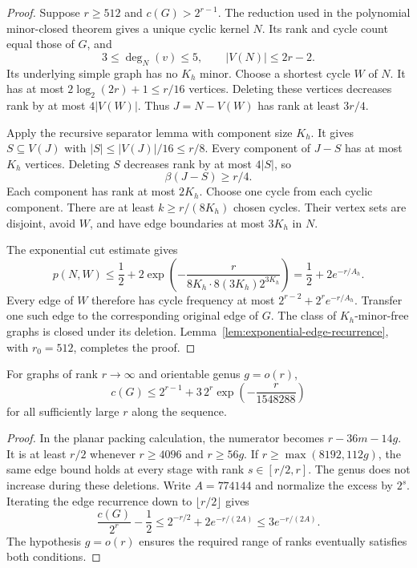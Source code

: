 \begin{proof}
Suppose $r\ge512$ and $c(G)>2^{r-1}$.
The reduction used in the polynomial minor-closed theorem gives a unique cyclic kernel $N$.
Its rank and cycle count equal those of $G$, and
\[
 3\le\deg_N(v)\le5,\qquad |V(N)|\le2r-2.
\]
Its underlying simple graph has no $K_h$ minor.
Choose a shortest cycle $W$ of $N$.
It has at most $2\log_2(2r)+1\le r/16$ vertices.
Deleting these vertices decreases rank by at most $4|V(W)|$.
Thus $J=N-V(W)$ has rank at least $3r/4$.

Apply the recursive separator lemma with component size $K_h$.
It gives $S\subseteq V(J)$ with $|S|\le|V(J)|/16\le r/8$.
Every component of $J-S$ has at most $K_h$ vertices.
Deleting $S$ decreases rank by at most $4|S|$, so
\[
 \beta(J-S)\ge r/4.
\]
Each component has rank at most $2K_h$.
Choose one cycle from each cyclic component.
There are at least $k\ge r/(8K_h)$ chosen cycles.
Their vertex sets are disjoint, avoid $W$, and have edge boundaries at most $3K_h$ in $N$.

The exponential cut estimate gives
\[
 p(N,W)\le\frac12+
 2\exp\!\left(-\frac{r}{8K_h\cdot8(3K_h)2^{3K_h}}\right)
 =\frac12+2e^{-r/A_h}.
\]
Every edge of $W$ therefore has cycle frequency at most
$2^{r-2}+2^r e^{-r/A_h}$.
Transfer one such edge to the corresponding original edge of $G$.
The class of $K_h$-minor-free graphs is closed under its deletion.
Lemma~\ref{lem:exponential-edge-recurrence}, with $r_0=512$, completes the proof.
\end{proof}

\begin{corollary}
\label{cor:sublinear-genus-exponential}
For graphs of rank $r\to\infty$ and orientable genus $g=o(r)$,
\[
 c(G)\le2^{r-1}+3\,2^r
 \exp\!\left(-\frac{r}{1548288}\right)
\]
for all sufficiently large $r$ along the sequence.
\end{corollary}

\begin{proof}
In the planar packing calculation, the numerator becomes $r-36m-14g$.
It is at least $r/2$ whenever $r\ge4096$ and $r\ge56g$.
If $r\ge\max(8192,112g)$, the same edge bound holds at every stage with rank $s\in[r/2,r]$.
The genus does not increase during these deletions.
Write $A=774144$ and normalize the excess by $2^s$.
Iterating the edge recurrence down to $\lfloor r/2\rfloor$ gives
\[
 \frac{c(G)}{2^r}-\frac12
 \le2^{-r/2}+2e^{-r/(2A)}
 \le3e^{-r/(2A)}.
\]
The hypothesis $g=o(r)$ ensures the required range of ranks eventually satisfies both conditions.
\end{proof}

